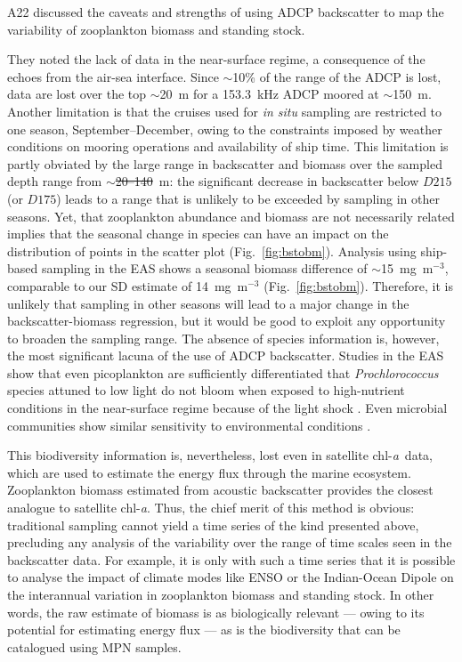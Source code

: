 \documentclass[authoryear,review,11pt]{elsarticle}
\newcommand{\chla}{chl-{\emph{a}}}
\providecommand{\DIFaddtex}[1]{{\protect\color{blue}\uwave{#1}}} %
\providecommand{\DIFdeltex}[1]{{\protect\color{red}\sout{#1}}}                      %
\providecommand{\DIFaddbegin}{} %
\providecommand{\DIFaddend}{} %
\providecommand{\DIFdelbegin}{} %
\providecommand{\DIFdelend}{} %
\providecommand{\DIFadd}[1]{\texorpdfstring{\DIFaddtex{#1}}{#1}} %
\providecommand{\DIFdel}[1]{\texorpdfstring{\DIFdeltex{#1}}{}} %
\begin{document}
A22 discussed the caveats and strengths of using ADCP backscatter to map the variability of zooplankton biomass and standing stock. 

They noted the lack of data in the near-surface regime, a consequence of the echoes from the air-sea interface. Since $\sim$10\% of the range of the ADCP is lost, data are lost over the top $\sim$20~m for a 153.3~kHz ADCP moored at $\sim$150~m. Another limitation is that the cruises used for \emph{in situ} sampling are restricted to one season, September--December, owing to the constraints imposed by weather conditions on mooring operations and availability of ship time. This limitation is partly obviated by the large range in backscatter and biomass over the sampled depth range from $\sim$\DIFdelbegin \DIFdel{20--140}\DIFdelend \DIFaddbegin \DIFadd{24--140}\DIFaddend ~m: the significant decrease in backscatter below $D215$ (or $D175$) leads to a range that is unlikely to be exceeded by sampling in other seasons.  Yet, that zooplankton abundance and biomass are not necessarily related \citep[see, for example,][]{madhupratap1990response, israel2018seasonal} implies that the seasonal change in species can have an impact on the distribution of points in the scatter plot (Fig.~\ref{fig:bstobm}). Analysis using ship-based sampling in the EAS \citep{jadhav2024abundance} shows a seasonal biomass difference of $\sim$15~mg~m$^{-3}$, comparable to our SD estimate of 14~mg~m$^{-3}$ (Fig.~\ref{fig:bstobm}). Therefore, it is unlikely that sampling in other seasons will lead to a major change in the backscatter-biomass regression, but it would be good to exploit any opportunity to broaden the sampling range.  The absence of species information is, however, the most significant lacuna of the use of ADCP backscatter.  Studies in the EAS show that even picoplankton are sufficiently differentiated that \emph{Prochlorococcus} species attuned to low light do not bloom when exposed to high-nutrient conditions in the near-surface regime because of the light shock \citep{bemal2018picophytoplankton}. Even microbial communities show similar sensitivity to environmental conditions \citep{khandeparker2025application}.

This biodiversity information is, nevertheless, lost even in satellite \chla\ data, which are used to estimate the energy flux through the marine ecosystem. Zooplankton biomass estimated from acoustic backscatter provides the closest analogue to satellite \chla.  Thus, the chief merit of this method is obvious: traditional sampling cannot yield a time series of the kind presented above, precluding any analysis of the variability over the range of time scales seen in the backscatter data. For example, it is only with such a time series that it is possible to analyse the impact of climate modes like ENSO \citep[El~Ni{\~n}o Southern Oscillation; see, for example,][]{sikka:1980} or the Indian-Ocean Dipole \citep[IOD;][]{saji/etal:1999} on the interannual variation in zooplankton biomass and standing stock. In other words, the raw estimate of biomass is as biologically relevant --- owing to its potential for estimating energy flux --- as is the biodiversity that can be catalogued using MPN samples.
\end{document}
